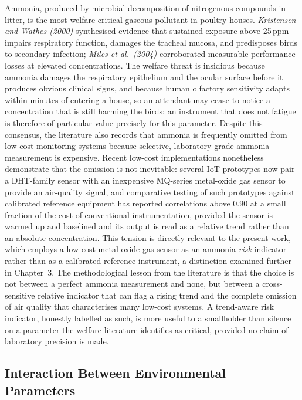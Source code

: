 \documentclass[12pt,a4paper]{report}
\begin{document}
Ammonia, produced by microbial decomposition of nitrogenous compounds in litter, is the most welfare-critical gaseous pollutant in poultry houses. \textit{Kristensen and Wathes (2000)} synthesised evidence that sustained exposure above 25\,ppm impairs respiratory function, damages the tracheal mucosa, and predisposes birds to secondary infection; \textit{Miles et al.\ (2004)} corroborated measurable performance losses at elevated concentrations. The welfare threat is insidious because ammonia damages the respiratory epithelium and the ocular surface before it produces obvious clinical signs, and because human olfactory sensitivity adapts within minutes of entering a house, so an attendant may cease to notice a concentration that is still harming the birds; an instrument that does not fatigue is therefore of particular value precisely for this parameter. Despite this consensus, the literature also records that ammonia is frequently omitted from low-cost monitoring systems because selective, laboratory-grade ammonia measurement is expensive. Recent low-cost implementations nonetheless demonstrate that the omission is not inevitable: several IoT prototypes now pair a DHT-family sensor with an inexpensive MQ-series metal-oxide gas sensor to provide an air-quality signal, and comparative testing of such prototypes against calibrated reference equipment has reported correlations above 0.90 at a small fraction of the cost of conventional instrumentation, provided the sensor is warmed up and baselined and its output is read as a relative trend rather than an absolute concentration. This tension is directly relevant to the present work, which employs a low-cost metal-oxide gas sensor as an ammonia-\emph{risk} indicator rather than as a calibrated reference instrument, a distinction examined further in Chapter~3. The methodological lesson from the literature is that the choice is not between a perfect ammonia measurement and none, but between a cross-sensitive relative indicator that can flag a rising trend and the complete omission of air quality that characterises many low-cost systems. A trend-aware risk indicator, honestly labelled as such, is more useful to a smallholder than silence on a parameter the welfare literature identifies as critical, provided no claim of laboratory precision is made.

\subsection{Interaction Between Environmental Parameters}
\end{document}
